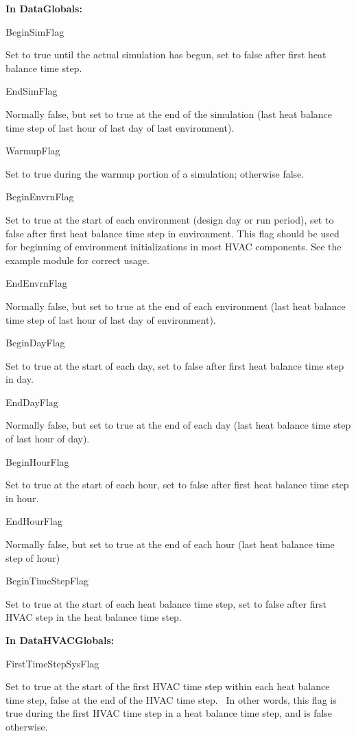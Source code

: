 \textbf{In DataGlobals:}

BeginSimFlag

Set to true until the actual simulation has begun, set to false after first heat balance time step.

EndSimFlag

Normally false, but set to true at the end of the simulation (last heat balance time step of last hour of last day of last environment).

WarmupFlag

Set to true during the warmup portion of a simulation; otherwise false.

BeginEnvrnFlag

Set to true at the start of each environment (design day or run period), set to false after first heat balance time step in environment. This flag should be used for beginning of environment initializations in most HVAC components. See the example module for correct usage.

EndEnvrnFlag

Normally false, but set to true at the end of each environment (last heat balance time step of last hour of last day of environment).

BeginDayFlag

Set to true at the start of each day, set to false after first heat balance time step in day.

EndDayFlag

Normally false, but set to true at the end of each day (last heat balance time step of last hour of day).

BeginHourFlag

Set to true at the start of each hour, set to false after first heat balance time step in hour.

EndHourFlag

Normally false, but set to true at the end of each hour (last heat balance time step of hour)

BeginTimeStepFlag

Set to true at the start of each heat balance time step, set to false after first HVAC step in the heat balance time step.

\textbf{In DataHVACGlobals:}

FirstTimeStepSysFlag

Set to true at the start of the first HVAC time step within each heat balance time step, false at the end of the HVAC time step.~ In other words, this flag is true during the first HVAC time step in a heat balance time step, and is false otherwise.

